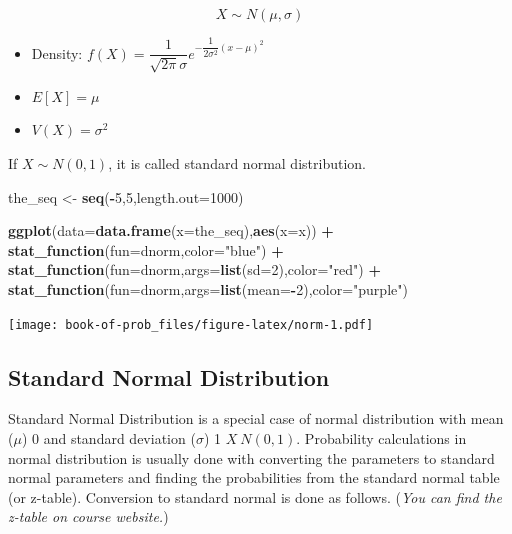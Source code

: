 \documentclass[]{book}
\newenvironment{Shaded}{\begin{snugshade}}{\end{snugshade}}
\newcommand{\DataTypeTok}[1]{\textcolor[rgb]{0.13,0.29,0.53}{#1}}
\newcommand{\DecValTok}[1]{\textcolor[rgb]{0.00,0.00,0.81}{#1}}
\newcommand{\KeywordTok}[1]{\textcolor[rgb]{0.13,0.29,0.53}{\textbf{#1}}}
\newcommand{\NormalTok}[1]{#1}
\newcommand{\OperatorTok}[1]{\textcolor[rgb]{0.81,0.36,0.00}{\textbf{#1}}}
\newcommand{\StringTok}[1]{\textcolor[rgb]{0.31,0.60,0.02}{#1}}
\theoremstyle{definition}
\theoremstyle{definition}
\theoremstyle{definition}
\theoremstyle{remark}
\begin{document}
\[X \sim N(\mu,\sigma)\]

\begin{itemize}
\item
  Density:
  \(f(X) = \dfrac{1}{\sqrt{2\pi}\sigma}e^{-\dfrac{1}{2\sigma^2}(x-\mu)^2}\)
\item
  \(E[X] = \mu\)
\item
  \(V(X) = \sigma^2\)
\end{itemize}

If \(X \sim N(0,1)\), it is called standard normal distribution.

\begin{Shaded}
\begin{Highlighting}[]
\NormalTok{the_seq <-}\StringTok{ }\KeywordTok{seq}\NormalTok{(}\OperatorTok{-}\DecValTok{5}\NormalTok{,}\DecValTok{5}\NormalTok{,}\DataTypeTok{length.out=}\DecValTok{1000}\NormalTok{)}

\KeywordTok{ggplot}\NormalTok{(}\DataTypeTok{data=}\KeywordTok{data.frame}\NormalTok{(}\DataTypeTok{x=}\NormalTok{the_seq),}\KeywordTok{aes}\NormalTok{(}\DataTypeTok{x=}\NormalTok{x)) }\OperatorTok{+}
\KeywordTok{stat_function}\NormalTok{(}\DataTypeTok{fun=}\NormalTok{dnorm,}\DataTypeTok{color=}\StringTok{"blue"}\NormalTok{) }\OperatorTok{+}
\KeywordTok{stat_function}\NormalTok{(}\DataTypeTok{fun=}\NormalTok{dnorm,}\DataTypeTok{args=}\KeywordTok{list}\NormalTok{(}\DataTypeTok{sd=}\DecValTok{2}\NormalTok{),}\DataTypeTok{color=}\StringTok{"red"}\NormalTok{) }\OperatorTok{+}
\KeywordTok{stat_function}\NormalTok{(}\DataTypeTok{fun=}\NormalTok{dnorm,}\DataTypeTok{args=}\KeywordTok{list}\NormalTok{(}\DataTypeTok{mean=}\OperatorTok{-}\DecValTok{2}\NormalTok{),}\DataTypeTok{color=}\StringTok{"purple"}\NormalTok{)}
\end{Highlighting}
\end{Shaded}

\texttt{[image: book-of-prob\_files/figure-latex/norm-1.pdf]}

\hypertarget{standard-normal-distribution}{%
\subsection{Standard Normal
Distribution}\label{standard-normal-distribution}}

Standard Normal Distribution is a special case of normal distribution
with mean (\(\mu\)) 0 and standard deviation (\(\sigma\)) 1
\(X ~ N(0,1)\). Probability calculations in normal distribution is
usually done with converting the parameters to standard normal
parameters and finding the probabilities from the standard normal table
(or z-table). Conversion to standard normal is done as follows.
(\emph{You can find the z-table on course website.})
\end{document}
